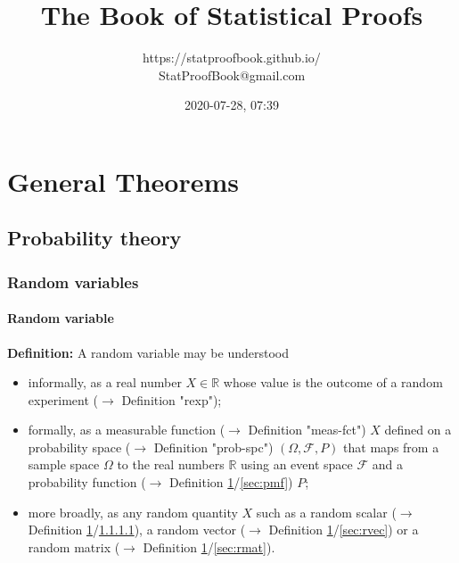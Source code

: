 \documentclass[a4paper,12pt,twoside]{book}
\title{\Huge{The Book of Statistical Proofs}}
\author{https://statproofbook.github.io/ \\ StatProofBook@gmail.com}
\date{2020-07-28, 07:39}
\begin{document}
\maketitle

\pagebreak
{}
\tableofcontents

\newpage
{}


\chapter{General Theorems} \label{sec:General Theorems} \newpage

\pagebreak
\section{Probability theory}

\subsection{Random variables}

\subsubsection[\textit{Random variable}]{Random variable} \label{sec:rvar}
\setcounter{equation}{0}

\textbf{Definition:} A random variable may be understood

\begin{itemize}

\item informally, as a real number $X \in \mathbb{R}$ whose value is the outcome of a random experiment ($\rightarrow$ Definition "rexp");

\item formally, as a measurable function ($\rightarrow$ Definition "meas-fct") $X$ defined on a probability space ($\rightarrow$ Definition "prob-spc") $(\Omega, \mathcal{F}, P)$ that maps from a sample space $\Omega$ to the real numbers $\mathbb{R}$ using an event space $\mathcal{F}$ and a probability function ($\rightarrow$ Definition \ref{sec:General Theorems}/\ref{sec:pmf}) $P$;

\item more broadly, as any random quantity $X$ such as a random scalar ($\rightarrow$ Definition \ref{sec:General Theorems}/\ref{sec:rvar}), a random vector ($\rightarrow$ Definition \ref{sec:General Theorems}/\ref{sec:rvec}) or a random matrix ($\rightarrow$ Definition \ref{sec:General Theorems}/\ref{sec:rmat}).

\end{itemize}
\end{document}
